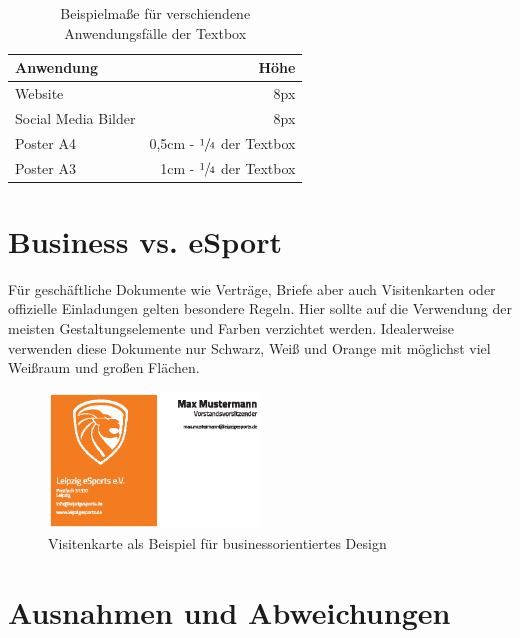 \documentclass{article}
\begin{document}
\begin{table}[H]
\begin{center}
\begin{tabular}{ | l | r | }
\hline
  \textbf{Anwendung} & \textbf{Höhe} \\
\hline
  Website & 8px \\
\hline
  Social Media Bilder & 8px \\
\hline
  Poster A4 & 0,5cm - $\sfrac{1}{4}$ der Textbox \\
\hline
  Poster A3 & 1cm - $\sfrac{1}{4}$ der Textbox \\
\hline
\end{tabular}
\end{center}
\caption{Beispielmaße für verschiendene Anwendungsfälle der Textbox}
\end{table}


\cleardoublepage
\section{Business vs. eSport}

Für geschäftliche Dokumente wie Verträge, Briefe aber auch Visitenkarten oder offizielle Einladungen gelten besondere Regeln.
Hier sollte auf die Verwendung der meisten Gestaltungselemente und Farben verzichtet werden.
Idealerweise verwenden diese Dokumente nur Schwarz, Weiß und Orange mit möglichst viel Weißraum und großen Flächen.

\begin{figure}[H]
\begin{center}
\includegraphics[width=0.5\textwidth]{Docs/Visitenkarte.eps}
\end{center}
\caption{Visitenkarte als Beispiel für businessorientiertes Design}
\end{figure}

\cleardoublepage
\section{Ausnahmen und Abweichungen}
\end{document}
